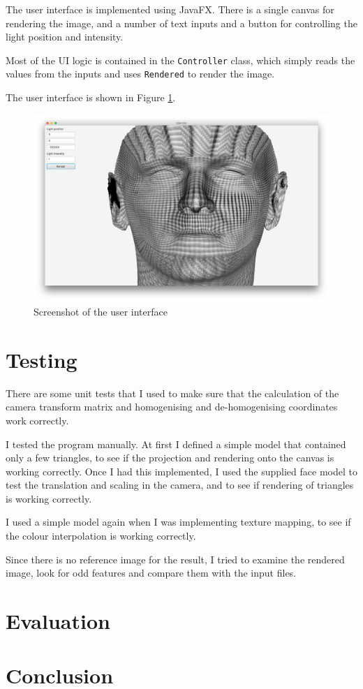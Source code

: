 \documentclass[]{article}
\begin{document}
The user interface is implemented using JavaFX. There is a single canvas for rendering the image, and a number of text inputs and a button for controlling the light position and intensity.

Most of the UI logic is contained in the \texttt{Controller} class, which simply reads the values from the inputs and uses \texttt{Rendered} to render the image.

The user interface is shown in Figure \ref{fig:ui}.

\begin{figure}
  \includegraphics[width=\textwidth]{figures/ui}
  \caption{Screenshot of the user interface}
  \label{fig:ui}
\end{figure}

\section{Testing}

There are some unit tests that I used to make sure that the calculation of the camera transform matrix and homogenising and de-homogenising coordinates work correctly.

I tested the program manually. At first I defined a simple model that contained only a few triangles, to see if the projection and rendering onto the canvas is working correctly. Once I had this implemented, I used the supplied face model to test the translation and scaling in the camera, and to see if rendering of triangles is working correctly.

I used a simple model again when I was implementing texture mapping, to see if the colour interpolation is working correctly.

Since there is no reference image for the result, I tried to examine the rendered image, look for odd features and compare them with the input files.

\section{Evaluation}

\section{Conclusion}
\end{document}
